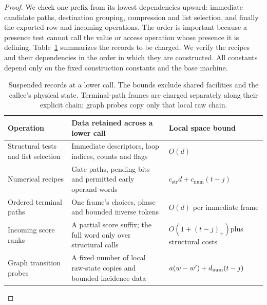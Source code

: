 \documentclass[11pt]{article}
\numberwithin{equation}{section}
\theoremstyle{definition}
\theoremstyle{remark}
\begin{document}
\begin{proof}
We check one prefix from its lowest dependencies upward: immediate candidate paths, destination grouping, compression and list selection, and finally the exported row and incoming operations. The order is important because a presence test cannot call the value or access operation whose presence it is defining. Table~\ref{tab:ctrl-records} summarizes the records to be charged.
We verify the recipes and their dependencies in the order in which they
are constructed.  All constants depend only on the fixed construction
constants and the base machine.

\begin{table}[tbp]
\centering
\small
\renewcommand{\arraystretch}{1.15}
\begin{tabular}{@{}p{}p{}p{}@{}}
\toprule
Operation & Data retained across a lower call & Local space bound \\
\midrule
Structural tests and list selection
 & Immediate descriptors, loop indices, counts and flags
 & $O(d)$ \\
Numerical recipes
 & Gate paths, pending bits and permitted early operand words
 & $c_{\mathrm{str}}d+c_{\mathrm{num}}(t-j)$ \\
Ordered terminal paths
 & One frame's choices, phase and bounded inverse tokens
 & $O(d)$ per immediate frame \\
Incoming score ranks
 & A partial score suffix; the full word only over structural calls
 & $O(1+(t-j)_+)$\newline plus structural costs \\
Graph transition probes
 & A fixed number of local raw-state copies and bounded incidence data
 & ${a}(w-w')+{d_{\rm num}}(t-j)$ \\
\bottomrule
\end{tabular}
\caption{Suspended records at a lower call.  The bounds exclude shared
facilities and the callee's physical state.  Terminal-path frames are
charged separately along their explicit chain; graph probes copy only
that local raw chain.}
\label{tab:ctrl-records}
\end{table}


\end{proof}
\end{document}
